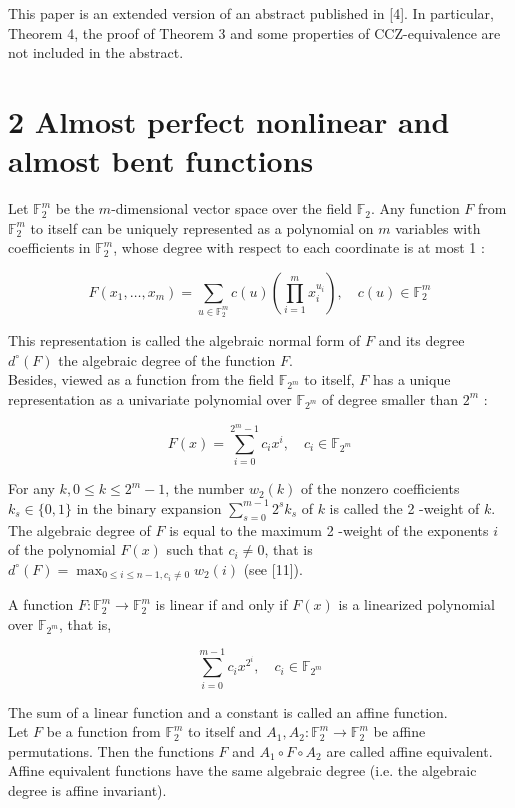 \documentclass[10pt]{article}
\begin{document}
This paper is an extended version of an abstract published in [4]. In particular, Theorem 4, the proof of Theorem 3 and some properties of CCZ-equivalence are not included in the abstract.

\section*{2 Almost perfect nonlinear and almost bent functions}
Let $\mathbb{F}_{2}^{m}$ be the $m$-dimensional vector space over the field $\mathbb{F}_{2}$. Any function $F$ from $\mathbb{F}_{2}^{m}$ to itself can be uniquely represented as a polynomial on $m$ variables with coefficients in $\mathbb{F}_{2}^{m}$, whose degree with respect to each coordinate is at most 1 :

$$
F\left(x_{1}, \ldots, x_{m}\right)=\sum_{u \in \mathbb{F}_{2}^{m}} c(u)\left(\prod_{i=1}^{m} x_{i}^{u_{i}}\right), \quad c(u) \in \mathbb{F}_{2}^{m}
$$

This representation is called the algebraic normal form of $F$ and its degree $d^{\circ}(F)$ the algebraic degree of the function $F$.\\
Besides, viewed as a function from the field $\mathbb{F}_{2^{m}}$ to itself, $F$ has a unique representation as a univariate polynomial over $\mathbb{F}_{2^{m}}$ of degree smaller than $2^{m}$ :

$$
F(x)=\sum_{i=0}^{2^{m}-1} c_{i} x^{i}, \quad c_{i} \in \mathbb{F}_{2^{m}}
$$

For any $k, 0 \leq k \leq 2^{m}-1$, the number $w_{2}(k)$ of the nonzero coefficients $k_{s} \in\{0,1\}$ in the binary expansion $\sum_{s=0}^{m-1} 2^{s} k_{s}$ of $k$ is called the 2 -weight of $k$. The algebraic degree of $F$ is equal to the maximum 2 -weight of the exponents $i$ of the polynomial $F(x)$ such that $c_{i} \neq 0$, that is $d^{\circ}(F)=\max _{0 \leq i \leq n-1, c_{i} \neq 0} w_{2}(i)$ (see [11]).

A function $F: \mathbb{F}_{2}^{m} \rightarrow \mathbb{F}_{2}^{m}$ is linear if and only if $F(x)$ is a linearized polynomial over $\mathbb{F}_{2^{m}}$, that is,

$$
\sum_{i=0}^{m-1} c_{i} x^{2^{i}}, \quad c_{i} \in \mathbb{F}_{2^{m}}
$$

The sum of a linear function and a constant is called an affine function.\\
Let $F$ be a function from $\mathbb{F}_{2}^{m}$ to itself and $A_{1}, A_{2}: \mathbb{F}_{2}^{m} \rightarrow \mathbb{F}_{2}^{m}$ be affine permutations. Then the functions $F$ and $A_{1} \circ F \circ A_{2}$ are called affine equivalent. Affine equivalent functions have the same algebraic degree (i.e. the algebraic degree is affine invariant).
\end{document}
